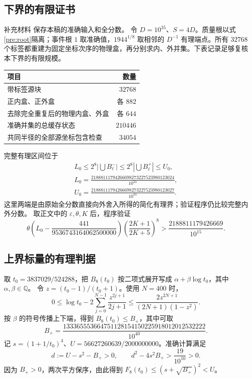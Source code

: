 \subsection{下界的有限证书}
补充材料  保存本稿的准确输入和全分数。
令 $D=10^{35}$、$S=4D$。质量根以式\eqref{pre:root}隔离；事件根 $1$ 取准确值，$1944^{1/8}$ 取相邻的 $D^{-1}$ 有理端点。所有 $32768$ 个标签都重建为固定坐标次序的物理盒，再分别求内、外并集。下表记录足够复核本下界的有限规模。
\begin{center}
\begin{tabular}{lr}
\toprule
项目&数量\\\midrule
带标签源块&$32768$\\
正内盒、正外盒&各 $882$\\
去除完全重复后的物理内盒、外盒&各 $644$\\
准确并集的总缓存状态&$210446$\\
共同半径的全部源坐标包含检查&$34054$\\
\bottomrule
\end{tabular}
\end{center}
完整有理区间位于
\[
\begin{gathered}
 L_0\le 2^8\left|\bigcup B_\ell^-\right|
 \le 2^8\left|\bigcup B_\ell^+\right|\le U_0,\\
 L_0=\frac{21888111794266698273227523980123024}{10^{34}},\\
 U_0=\frac{21888111794266698273227523980123027}{10^{34}}.
\end{gathered}
\]
这里两端是由原始全分数直接向外舍入所得的简化有理界；验证程序仍比较完整内外分数。
取正文中的 $\varepsilon,\theta,K$ 后，程序验证
\[
 \theta\left(L_0-\frac{441}{9536743164062500000}\right)
 \left(\frac{2K+1}{2K+5}\right)^8
 >\frac{2188811179426669}{10^{15}}.
\]

\subsection{上界标量的有理判据}
取 $t_0=3837029/524288$，把 $B_8(t_0)$ 按二项式展开写成
$\alpha+\beta\log t_0$，其中 $\alpha,\beta\in\mathbb Q$。
令 $z=(t_0-1)/(t_0+1)$。使用 $N=400$ 时，
\[
 0\le\log t_0-2\sum_{j=0}^{N-1}\frac{z^{2j+1}}{2j+1}
 \le\frac{2z^{2N+1}}{(2N+1)(1-z^2)}.
\]
按 $\beta$ 的符号传播上下端，得到 $B_8(t_0)\le B_+$，其中可取
\[
 B_+=\frac{133365553664751128154150225918012012532222}{10^{40}}.
\]
记 $s=(1+1/t_0)^4$、$U=56627260639/2000000000$。准确计算满足
\[
 d:=U-s^2-B_+>0,\qquad
 d^2-4s^2B_+>\frac{19}{10^{10}}>0.
\]
因为 $B_+>0$，两次平方保序，由此得到
$F_8(t_0)\le(s+\sqrt{B_+})^2<U$。

